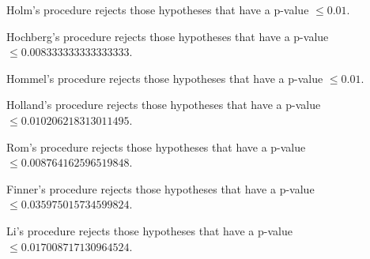 \documentclass[a4paper,10pt]{article}
\begin{document}
\begin{landscape}
Holm's procedure rejects those hypotheses that have a p-value $\le0.01$.


Hochberg's procedure rejects those hypotheses that have a p-value $\le0.008333333333333333$.


Hommel's procedure rejects those hypotheses that have a p-value $\le0.01$.


Holland's procedure rejects those hypotheses that have a p-value $\le0.010206218313011495$.


Rom's procedure rejects those hypotheses that have a p-value $\le0.008764162596519848$.


Finner's procedure rejects those hypotheses that have a p-value $\le0.035975015734599824$.


Li's procedure rejects those hypotheses that have a p-value $\le0.017008717130964524$.



\newpage


\end{landscape}
\end{document}
